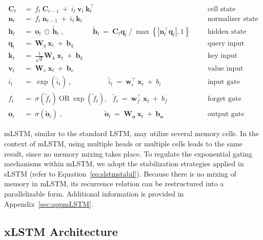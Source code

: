 \begin{align}
\label{eq:mlstm_recurrent_begin}
\mathbf{C}_t \ &= \  f_t \ \mathbf{C}_{t-1} \ + \ 
  i_t \ \mathbf{v}_t \ \mathbf{k}_t^\top & &  &\text{cell state} \\
\mathbf{n}_t \ &= \  f_t \ \mathbf{n}_{t-1} \ + \ 
  i_t \ \mathbf{k}_t & &  &\text{normalizer state} \\
\mathbf{h}_t  \ &= \ \mathbf{o}_t \ \odot \ \tilde{\mathbf{h}}_t
\ , \qquad \qquad 
\tilde{\mathbf{h}}_t \ = \   \mathbf{C}_t \mathbf{q}_t \ / \ 
  \max \left\{ |\mathbf{n}_t^\top \mathbf{q}_t|, 1 \right\} 
   &&&\text{hidden state} \\
\mathbf{q}_t \ &= \ \mathbf{W}_q \ \mathbf{x}_t \ + \ \mathbf{b}_q  & &  &\text{query input} \\
\mathbf{k}_t \ &= \ \frac{1}{\sqrt{d}} \mathbf{W}_k \ \mathbf{x}_t \ + \ \mathbf{b}_k  & &  &\text{key input} \\
\mathbf{v}_t \ &= \ \mathbf{W}_v \ \mathbf{x}_t \ + \ \mathbf{b}_v  & &  &\text{value input} \\
i_t \ &= \ \!\exp \!  \! \left( \tilde{i}_t  \right) \ , 
 \qquad \qquad \ \ \ \ \,
  \tilde{i}_t \ = \ \mathbf{w}^\top_{i} \ \mathbf{x}_t \ + \  b_{i} \ \ \ 
  &&&\text{input gate} \\
f_t \ &= \ \sigma \!  \left(  \tilde{f}_t \right) \ \text{OR} \ \!\exp \!  \! \left(  \tilde{f}_t \right) , \ \ \: \!
\tilde{f}_t \ = \ \mathbf{w}^\top_{f} \ \mathbf{x}_t  \ + \
  b_{f}
  &&& \text{forget gate} \\
\label{eq:mlstm_recurrent_end}
\mathbf{o}_t \ &= \ \sigma \left( \tilde{\mathbf{o}}_t \right) \ , \qquad \qquad \quad \ \ \ \,
  \tilde{\mathbf{o}}_t  \ = \ \mathbf{W}_{\mathbf{o}} \ \mathbf{x}_t \ + \
  \mathbf{b}_{\mathbf{o}}
  &&&\text{output gate} 
\end{align}

mLSTM, similar to the standard LSTM, may utilize several memory cells. In the context of mLSTM, using multiple heads or multiple cells leads to the same result, since no memory mixing takes place. To regulate the exponential gating mechanisms within mLSTM, we adopt the stabilization strategies applied in sLSTM (refer to Equation~\ref{eq:slstmstabil}). Because there is no mixing of memory in mLSTM, its recurrence relation can be restructured into a parallelizable form. Additional information is provided in Appendix~\ref{sec:appmLSTM}.

\subsection{xLSTM Architecture}
\label{sec:xLSTMarch}

